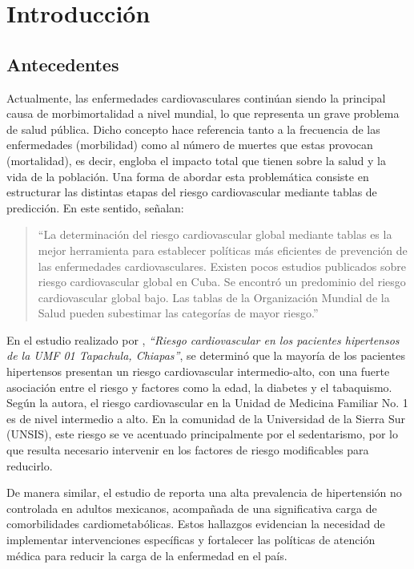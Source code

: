 \chapter{Introducción}

\section{Antecedentes}
    Actualmente, las enfermedades cardiovasculares continúan siendo la principal causa de morbimortalidad a nivel mundial, lo que representa un grave problema de salud pública. Dicho concepto hace referencia tanto a la frecuencia de las enfermedades (morbilidad) como al número de muertes que estas provocan (mortalidad), es decir, engloba el impacto total que tienen sobre la salud y la vida de la población. Una forma de abordar esta problemática consiste en estructurar las distintas etapas del riesgo cardiovascular mediante tablas de predicción. En este sentido, \textcite{rodriguez2023riesgo} señalan:
    
    \begin{quote}
    “La determinación del riesgo cardiovascular global mediante tablas es la mejor herramienta para establecer políticas más eficientes de prevención de las enfermedades cardiovasculares. Existen pocos estudios publicados sobre riesgo cardiovascular global en Cuba. Se encontró un predominio del riesgo cardiovascular global bajo. Las tablas de la Organización Mundial de la Salud pueden subestimar las categorías de mayor riesgo.” 
    \end{quote}
    En el estudio realizado por \textcite{ancheytariesgo}, \textit{“Riesgo cardiovascular en los pacientes hipertensos de la UMF 01 Tapachula, Chiapas”}, se determinó que la mayoría de los pacientes hipertensos presentan un riesgo cardiovascular intermedio-alto, con una fuerte asociación entre el riesgo y factores como la edad, la diabetes y el tabaquismo. Según la autora, el riesgo cardiovascular en la Unidad de Medicina Familiar No. 1 es de nivel intermedio a alto. En la comunidad de la Universidad de la Sierra Sur (UNSIS), este riesgo se ve acentuado principalmente por el sedentarismo, por lo que resulta necesario intervenir en los factores de riesgo modificables para reducirlo.

    De manera similar, el estudio de \textcite{10.1093/ajh/hpae024} reporta una alta prevalencia de hipertensión no controlada en adultos mexicanos, acompañada de una significativa carga de comorbilidades cardiometabólicas. Estos hallazgos evidencian la necesidad de implementar intervenciones específicas y fortalecer las políticas de atención médica para reducir la carga de la enfermedad en el país.
    
